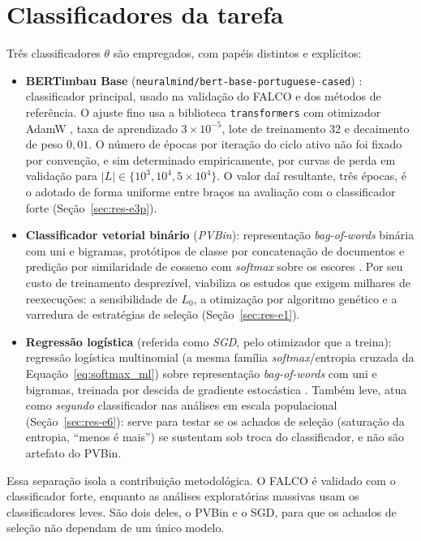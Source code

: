 \section{Classificadores da tarefa}
\label{sec:metodo-classificadores}

Três
classificadores $\theta$ são empregados, com papéis distintos e explícitos:

\begin{itemize}
  \item \textbf{BERTimbau Base} (\texttt{neuralmind/bert-base-portuguese-cased})
  \citep{Souza2020BERTimbau}: classificador principal, usado na validação do FALCO e
  dos métodos de referência. O ajuste fino usa a biblioteca
  \texttt{transformers} \citep{Wolf2020Transformers} com otimizador AdamW
  \citep{Loshchilov2019AdamW}, taxa de aprendizado $3\times10^{-5}$, lote de
  treinamento 32 e decaimento de peso $0{,}01$. O número de épocas por iteração
  do ciclo ativo não foi fixado por convenção, e sim determinado empiricamente,
  por curvas de perda em validação para $|L| \in \{10^3, 10^4, 5\times10^4\}$. O
  valor daí resultante, três épocas, é o adotado de forma uniforme entre braços
  na avaliação com o classificador forte (Seção~\ref{sec:res-e3p}).
  \item \textbf{Classificador vetorial binário} (\textit{PVBin}): representação
  \textit{bag-of-words} binária com uni e bigramas, protótipos de classe por
  concatenação de documentos e predição por similaridade de cosseno com
  \textit{softmax} sobre os escores \citep{Daru2024Dissertacao}. Por seu custo de
  treinamento desprezível, viabiliza os estudos que exigem milhares de reexecuções:
  a sensibilidade de $L_0$, a otimização por algoritmo genético e a varredura
  de estratégias de seleção (Seção~\ref{sec:res-e1}).
  \item \textbf{Regressão logística} (referida como \textit{SGD}, pelo
  otimizador que a treina): regressão logística
  multinomial (a mesma família \textit{softmax}/entropia cruzada da
  Equação~\ref{eq:softmax_ml}) sobre representação \textit{bag-of-words}
  com uni e bigramas, treinada por descida de gradiente estocástica
  \citep{Bishop2006}. Também leve, atua como \emph{segundo} classificador nas
  análises em escala populacional (Seção~\ref{sec:res-e6}): serve para testar se os achados de
  seleção (saturação da entropia, ``menos é mais'') se sustentam sob troca do
  classificador, e não são artefato do PVBin.
\end{itemize}

Essa separação isola a contribuição metodológica. O FALCO é validado com o
classificador forte, enquanto as análises exploratórias massivas usam os
classificadores leves. São dois deles, o PVBin e o SGD, para que os achados de
seleção não dependam de um único modelo.

